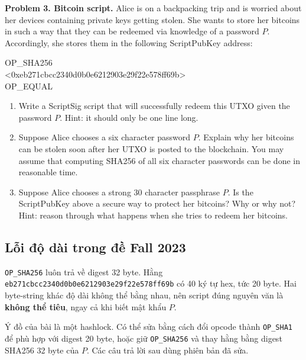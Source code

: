 
\begin{summarybox}
\textbf{Problem 3. Bitcoin script.}
Alice is on a backpacking trip and is worried about her devices containing
private keys getting stolen. She wants to store her bitcoins in such a way
that they can be redeemed via knowledge of a password $P$. Accordingly, she
stores them in the following ScriptPubKey address:
\begin{center}
\normalfont\ttfamily
OP\_SHA256\\
<0xeb271cbcc2340d0b0e6212903e29f22e578ff69b>\\
OP\_EQUAL
\end{center}
\begin{enumerate}[label=\alph*.,leftmargin=1.5em]
  \item Write a ScriptSig script that will successfully redeem this UTXO
        given the password $P$. Hint: it should only be one line long.
  \item Suppose Alice chooses a six character password $P$. Explain why her
        bitcoins can be stolen soon after her UTXO is posted to the
        blockchain. You may assume that computing SHA256 of all six character
        passwords can be done in reasonable time.
  \item Suppose Alice chooses a strong 30 character passphrase $P$. Is the
        ScriptPubKey above a secure way to protect her bitcoins? Why or why
        not? Hint: reason through what happens when she tries to redeem her
        bitcoins.
\end{enumerate}
\end{summarybox}

\solution

\subsection*{Lỗi độ dài trong đề Fall 2023}

\texttt{OP\_SHA256} luôn trả về digest 32 byte. Hằng
\texttt{eb271cbcc2340d0b0e6212903e29f22e578ff69b} có 40 ký tự hex, tức 20
byte. Hai byte-string khác độ dài không thể bằng nhau, nên script đúng nguyên
văn là \textbf{không thể tiêu}, ngay cả khi biết mật khẩu $P$.

Ý đồ của bài là một hashlock. Có thể sửa bằng cách đổi opcode thành
\texttt{OP\_SHA1} để phù hợp với digest 20 byte, hoặc giữ
\texttt{OP\_SHA256} và thay hằng bằng digest SHA256 32 byte của $P$. Các câu
trả lời sau dùng phiên bản đã sửa.

